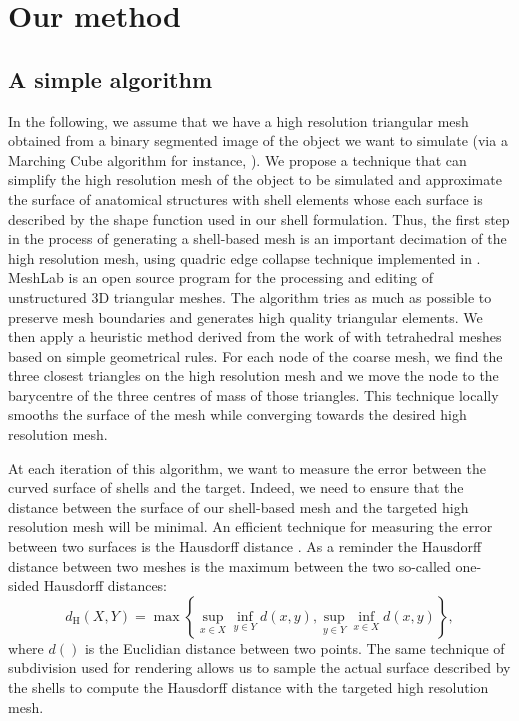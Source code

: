 \section{Our method}

	\subsection{A simple algorithm}
	
In the following, we assume that we have a high resolution triangular mesh obtained from a binary segmented image of the object we want to simulate (via a Marching Cube algorithm for instance, \cite{Lorensen87}). We propose a technique that can simplify the high resolution mesh of the object to be simulated and approximate the surface of anatomical structures with shell elements whose each surface is described by the shape function used in our shell formulation. Thus, the first step in the process of generating a shell-based mesh is an important decimation of the high resolution mesh, using quadric edge collapse technique implemented in \citeauthor{Meshlab}. MeshLab is an open source program for the processing and editing of unstructured 3D triangular meshes. The algorithm tries as much as possible to preserve mesh boundaries and generates high quality triangular elements. We then apply a heuristic method derived from the work of \cite{Saupin07} with tetrahedral meshes based on simple geometrical rules. For each node of the coarse mesh, we find the three closest triangles on the high resolution mesh and we move the node to the barycentre of the three centres of mass of those triangles. This technique locally smooths the surface of the mesh while converging towards the desired high resolution mesh. 

At each iteration of this algorithm, we want to measure the error between the curved surface of shells and the target. Indeed, we need to ensure that the distance between the surface of our shell-based mesh and the targeted high resolution mesh will be minimal. An efficient technique for measuring the error between two surfaces is the Hausdorff distance \citep{Klein96}. As a reminder the Hausdorff distance between two meshes is the maximum between the two so-called one-sided Hausdorff distances:
\begin{equation}
d_{\mathrm{H}}(X,Y) = \max \left\{ \sup_{x \in X} \inf_{y \in Y} d(x,y), \sup_{y \in Y} \inf_{x \in X} d(x,y) \right\},
\end{equation}
where $d()$ is the Euclidian distance between two points. The same technique of subdivision used for rendering allows us to sample the actual surface described by the shells to compute the Hausdorff distance with the targeted high resolution mesh. 

